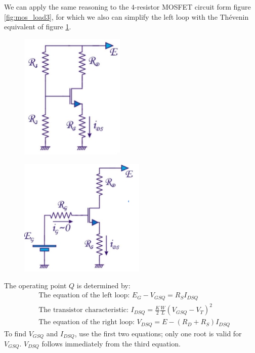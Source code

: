 We can apply the same reasoning to the $4$-resistor MOSFET circuit form figure \ref{fig:mos_load3}, for which we also can simplify the left loop with the Thévenin equivalent of figure \ref{fig:mos_load4}.
\begin{figure}[h!]
	\centering
	\begin{minipage}{.5\textwidth}
		\centering
		\includegraphics[width=5cm]{figures/ch02/mos_load3.jpg}
		\label{fig:mos_load3}
	\end{minipage}%
	\begin{minipage}{.5\textwidth}
		\centering
		\includegraphics[width=6cm]{figures/ch02/mos_load4.jpg}
		\label{fig:mos_load4}
	\end{minipage}
\end{figure}
The operating  point $Q$ is determined by:
\begin{align*}
	&\text{The equation of the left loop: } E_G - V_{GSQ} = R_S I_{DSQ} \\
	&\text{The transistor characteristic: } I_{DSQ} = \frac{K}{2}\frac{W}{L} (V_{GSQ} - V_T)^2 \\
	&\text{The equation of the right loop: } V_{DSQ} = E - (R_D + R_S)I_{DSQ}
\end{align*}
To find $V_{GSQ}$ and $I_{DSQ}$, use the first two equations; only one root is valid for $V_{GSQ}$. $V_{DSQ}$ follows immediately from the third equation.

